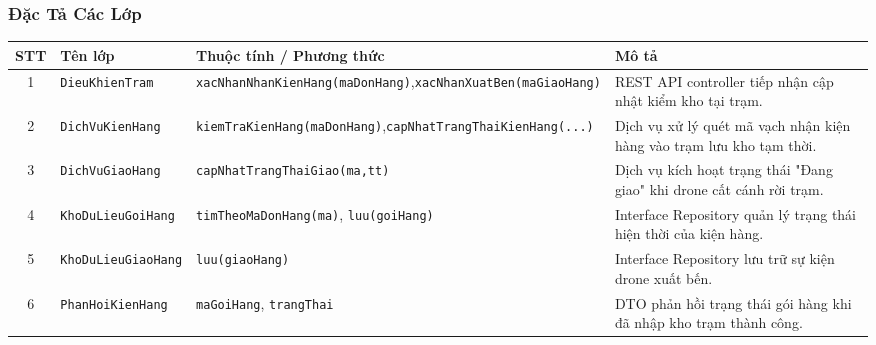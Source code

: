 \subsubsection{Đặc Tả Các Lớp}
\begin{table}[H]
  \centering
  \small
  \begin{tabularx}{\textwidth}{|c|>{\raggedright\arraybackslash}p{3.5cm}|>{\raggedright\arraybackslash}p{4.5cm}|>{\raggedright\arraybackslash}X|}
    \hline
    \textbf{STT} & \textbf{Tên lớp} & \textbf{Thuộc tính / Phương thức} & \textbf{Mô tả} \\
    \hline
    1 & \texttt{Dieu\allowbreak Khien\allowbreak Tram} & \texttt{xac\allowbreak Nhan\allowbreak Nhan\allowbreak Kien\allowbreak Hang\allowbreak (ma\allowbreak Don\allowbreak Hang)},\newline \texttt{xac\allowbreak Nhan\allowbreak Xuat\allowbreak Ben\allowbreak (ma\allowbreak Giao\allowbreak Hang)} & REST API controller tiếp nhận cập nhật kiểm kho tại trạm. \\ \hline
    2 & \texttt{Dich\allowbreak Vu\allowbreak Kien\allowbreak Hang} & \texttt{kiem\allowbreak Tra\allowbreak Kien\allowbreak Hang\allowbreak (ma\allowbreak Don\allowbreak Hang)},\newline \texttt{cap\allowbreak Nhat\allowbreak Trang\allowbreak Thai\allowbreak Kien\allowbreak Hang\allowbreak (...)} & Dịch vụ xử lý quét mã vạch nhận kiện hàng vào trạm lưu kho tạm thời. \\ \hline
    3 & \texttt{Dich\allowbreak Vu\allowbreak Giao\allowbreak Hang} & \texttt{cap\allowbreak Nhat\allowbreak Trang\allowbreak Thai\allowbreak Giao\allowbreak (ma,\allowbreak tt)} & Dịch vụ kích hoạt trạng thái "Đang giao" khi drone cất cánh rời trạm. \\ \hline
    4 & \texttt{Kho\allowbreak Du\allowbreak Lieu\allowbreak Goi\allowbreak Hang} & \texttt{tim\allowbreak Theo\allowbreak Ma\allowbreak Don\allowbreak Hang\allowbreak (ma)}, \texttt{luu\allowbreak (goi\allowbreak Hang)} & Interface Repository quản lý trạng thái hiện thời của kiện hàng. \\ \hline
    5 & \texttt{Kho\allowbreak Du\allowbreak Lieu\allowbreak Giao\allowbreak Hang} & \texttt{luu\allowbreak (giao\allowbreak Hang)} & Interface Repository lưu trữ sự kiện drone xuất bến. \\ \hline
    6 & \texttt{Phan\allowbreak Hoi\allowbreak Kien\allowbreak Hang} & \texttt{ma\allowbreak Goi\allowbreak Hang}, \texttt{trang\allowbreak Thai} & DTO phản hồi trạng thái gói hàng khi đã nhập kho trạm thành công. \\ \hline

\end{tabularx}
\end{table}
